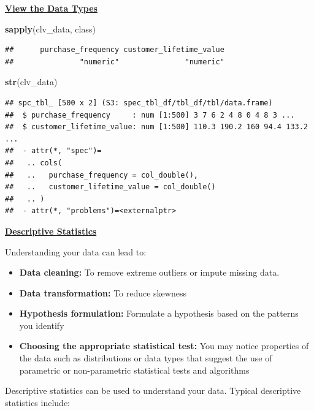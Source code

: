 \documentclass[
]{article}
\newenvironment{Shaded}{\begin{snugshade}}{\end{snugshade}}
\newcommand{\FunctionTok}[1]{\textcolor[rgb]{0.13,0.29,0.53}{\textbf{#1}}}
\newcommand{\NormalTok}[1]{#1}
\begin{document}
\ul{\textbf{View the Data Types}}

\begin{Shaded}
\begin{Highlighting}[]
\FunctionTok{sapply}\NormalTok{(clv\_data, class)}
\end{Highlighting}
\end{Shaded}

\begin{verbatim}
##      purchase_frequency customer_lifetime_value 
##               "numeric"               "numeric"
\end{verbatim}

\begin{Shaded}
\begin{Highlighting}[]
\FunctionTok{str}\NormalTok{(clv\_data)}
\end{Highlighting}
\end{Shaded}

\begin{verbatim}
## spc_tbl_ [500 x 2] (S3: spec_tbl_df/tbl_df/tbl/data.frame)
##  $ purchase_frequency     : num [1:500] 3 7 6 2 4 8 0 4 8 3 ...
##  $ customer_lifetime_value: num [1:500] 110.3 190.2 160 94.4 133.2 ...
##  - attr(*, "spec")=
##   .. cols(
##   ..   purchase_frequency = col_double(),
##   ..   customer_lifetime_value = col_double()
##   .. )
##  - attr(*, "problems")=<externalptr>
\end{verbatim}

\ul{\textbf{Descriptive Statistics}}

Understanding your data can lead to:

\begin{itemize}
\item
  \textbf{Data cleaning:} To remove extreme outliers or impute missing
  data.
\item
  \textbf{Data transformation:} To reduce skewness
\item
  \textbf{Hypothesis formulation:} Formulate a hypothesis based on the
  patterns you identify
\item
  \textbf{Choosing the appropriate statistical test:} You may notice
  properties of the data such as distributions or data types that
  suggest the use of parametric or non-parametric statistical tests and
  algorithms
\end{itemize}

Descriptive statistics can be used to understand your data. Typical
descriptive statistics include:
\end{document}
